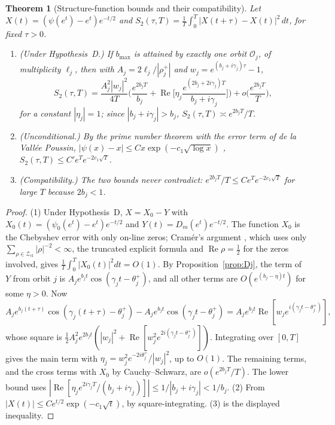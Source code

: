 \documentclass[11pt]{amsart}
\newtheorem{theorem}{Theorem}[section]
\theoremstyle{definition}
\theoremstyle{remark}
\renewcommand{\Re}{\operatorname{Re}}
\newcommand{\half}{\tfrac12}
\newcommand{\Zcl}{\mathcal Z_{\mathrm{cl}}}
\begin{document}
\begin{theorem}[Structure-function bounds and their compatibility]\label{thm:struct}
Let $X(t)=(\psi(e^t)-e^t)e^{-t/2}$ and $S_2(\tau,T)=\frac1T\int_0^T|X(t+\tau)-X(t)|^2\,dt$, for
fixed $\tau>0$.
\begin{enumerate}
\item \emph{(Under Hypothesis~D.)} If $b_{\max}$ is attained by exactly one orbit $\mathcal O_j$, of
multiplicity $\ell_j$, then with $A_j=2\ell_j/|\rho_j^+|$ and $w_j=e^{(b_j+i\gamma_j)\tau}-1$,
\[
S_2(\tau,T)=\frac{A_j^2|w_j|^2}{4T}\Big(\frac{e^{2b_jT}}{b_j}+\Re\Big[\eta_j
\frac{e^{(2b_j+2i\gamma_j)T}}{b_j+i\gamma_j}\Big]\Big)+o\Big(\frac{e^{2b_jT}}T\Big),
\]
for a constant $|\eta_j|=1$; since $|b_j+i\gamma_j|>b_j$, $S_2(\tau,T)\asymp e^{2b_jT}/T$.
\item \emph{(Unconditional.)} By the prime number theorem with the error term of de la
Vall\'ee Poussin, $|\psi(x)-x|\le Cx\exp(-c_1\sqrt{\log x})$ \cite[Ch.~18]{Davenport},
$S_2(\tau,T)\le C'e^{T}e^{-2c_1\sqrt T}$.
\item \emph{(Compatibility.)} The two bounds never contradict:
$e^{2b_jT}/T\le Ce^Te^{-2c_1\sqrt T}$ for large $T$ because $2b_j<1$.
\end{enumerate}
\end{theorem}
\begin{proof}
(1) Under Hypothesis~D, $X=X_0-Y$ with $X_0(t)=(\psi_0(e^t)-e^t)e^{-t/2}$ and
$Y(t)=D_m(e^t)e^{-t/2}$. The function $X_0$ is the Chebyshev error with only on-line zeros;
Cram\'er's argument \cite{Cramer}, which uses only $\sum_{\rho\in\Zcl}|\rho|^{-2}<\infty$, the
truncated explicit formula and $\Re\rho=\half$ for the zeros involved, gives
$\frac1T\int_0^T|X_0(t)|^2dt=O(1)$. By Proposition~\ref{prop:Dj}, the term of $Y$ from orbit $j$
is $A_je^{b_jt}\cos(\gamma_jt-\theta_j^+)$, and all other terms are $O(e^{(b_j-\eta)t})$ for
some $\eta>0$. Now
\[
A_je^{b_j(t+\tau)}\cos(\gamma_j(t+\tau)-\theta_j^+)-A_je^{b_jt}\cos(\gamma_jt-\theta_j^+)
=A_je^{b_jt}\Re[w_je^{i(\gamma_jt-\theta_j^+)}],
\]
whose square is
$\half A_j^2e^{2b_jt}(|w_j|^2+\Re[w_j^2e^{2i(\gamma_jt-\theta_j^+)}])$. Integrating over $[0,T]$
gives the main term with $\eta_j=w_j^2e^{-2i\theta_j^+}/|w_j|^2$, up to $O(1)$. The
remaining terms, and the cross terms with $X_0$ by Cauchy--Schwarz, are
$o(e^{2b_jT}/T)$. The lower bound uses $|\Re[\eta_je^{2i\gamma_jT}/(b_j+i\gamma_j)]|\le
1/|b_j+i\gamma_j|<1/b_j$. (2) From $|X(t)|\le Ce^{t/2}\exp(-c_1\sqrt t)$, by
square-integrating. (3) is the displayed inequality.
\end{proof}
\end{document}
